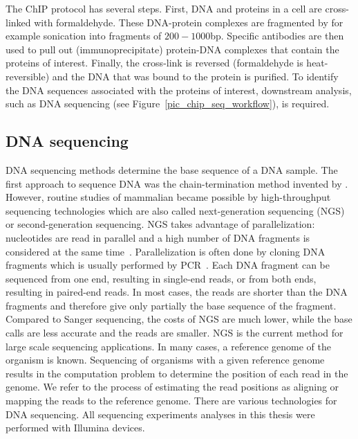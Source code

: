 The ChIP protocol has several steps.
First, DNA and proteins in a cell are cross-linked with formaldehyde.
These DNA-protein complexes are fragmented by for example sonication into fragments of $200-1000$bp.
Specific antibodies are then used to pull out (immunoprecipitate) protein-DNA complexes that contain the proteins of interest. 
Finally, the cross-link is reversed (formaldehyde is heat-reversible) and the DNA that was bound to the protein is purified.
To identify the DNA sequences associated with the proteins of interest, downstream analysis, such as DNA sequencing (see Figure~\ref{pic_chip_seq_workflow}), is required.

\subsection{DNA sequencing}
\label{sec_dna_sequencing}
DNA sequencing methods determine the base sequence of a DNA sample.
The first approach to sequence DNA was the chain-termination method invented by \cite{sanger:1977}.
However, routine studies of mammalian became possible by high-throughput sequencing technologies which are also called next-generation sequencing (NGS) or second-generation sequencing.
NGS takes advantage of parallelization: nucleotides are read in parallel and a high number of DNA fragments is considered at the same time~\citep{shendure:2008}.
Parallelization is often done by cloning DNA fragments which is usually performed by PCR~\citep{Mullis1987}.
Each DNA fragment can be sequenced from one end, resulting in single-end reads, or from both ends, resulting in paired-end reads.
In most cases, the reads are shorter than the DNA fragments and therefore give only partially the base sequence of the fragment.
Compared to Sanger sequencing, the costs of NGS are much lower, while the base calls are less accurate and the reads are smaller.
NGS is the current method for large scale sequencing applications.
In many cases, a reference genome of the organism is known.
Sequencing of organisms with a given reference genome results in the computation problem to determine the position of each read in the genome.
We refer to the process of estimating the read positions as aligning or mapping the reads to the reference genome.
There are various technologies for DNA sequencing.
All sequencing experiments analyses in this thesis were performed with Illumina devices.


